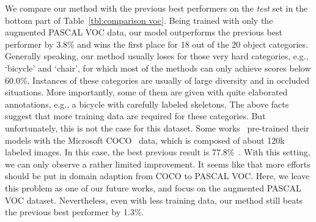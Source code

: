 \documentclass{article}
\begin{document}
We compare our method with the previous best performers on the \emph{test} set in the bottom part of Table~\ref{tbl:comparison voc}.
Being trained with only the augmented PASCAL VOC data, our model outperforms the previous best performer by 3.8\% and wins the first place for 18 out of the 20 object categories.
Generally speaking, our method usually loses for those very hard categories, e.g., `bicycle' and `chair', for which most of the methods can only achieve scores below 60.0\%.
Instances of these categories are usually of large diversity and in occluded situations.
More importantly, some of them are given with quite elaborated annotations, e.g., a bicycle with carefully labeled skeletons.
The above facts suggest that more training data are required for these categories.
But unfortunately, this is not the case for this dataset.
Some works~\cite{CRFasRNN.ICCV.2015.Zheng,DPN.ICCV.2015.Liu,AdelaideContext.2016.Lin} pre-trained their models with the Microsoft COCO~\cite{COCO.ECCV.2014.Lin} data, which is composed of about 120k labeled images.
In this case, the best previous result is 77.8\%~\cite{AdelaideContext.2016.Lin}.
With this setting, we can only observe a rather limited improvement.
It seems like that more efforts should be put in domain adaption from COCO to PASCAL VOC.
Here, we leave this problem as one of our future works, and focus on the augmented PASCAL VOC dataset.
Nevertheless, even with less training data, our method still beats the previous best performer by 1.3\%.
\end{document}
